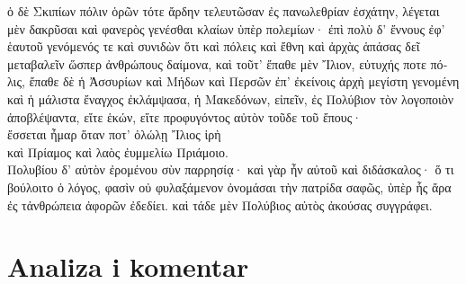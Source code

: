 {\large

\begin{greek}

\noindent  ὁ δὲ Σκιπίων πόλιν ὁρῶν τότε ἄρδην τελευτῶσαν ἐς πανωλεθρίαν ἐσχάτην, λέγεται μὲν δακρῦσαι καὶ φανερὸς γενέσθαι κλαίων ὑπὲρ πολεμίων· ἐπὶ πολὺ δ' ἔννους ἐφ' ἑαυτοῦ γενόμενός τε καὶ συνιδὼν ὅτι καὶ πόλεις καὶ ἔθνη καὶ ἀρχὰς ἁπάσας δεῖ μεταβαλεῖν ὥσπερ ἀνθρώπους δαίμονα, καὶ τοῦτ' ἔπαθε μὲν Ἴλιον, εὐτυχής ποτε πόλις, ἔπαθε δὲ ἡ Ἀσσυρίων καὶ Μήδων καὶ Περσῶν ἐπ' ἐκείνοις ἀρχὴ μεγίστη γενομένη καὶ ἡ μάλιστα ἔναγχος ἐκλάμψασα, ἡ Μακεδόνων, εἰπεῖν, ἐς Πολύβιον τὸν λογοποιὸν ἀποβλέψαντα, εἴτε ἑκών, εἴτε προφυγόντος αὐτὸν τοῦδε τοῦ ἔπους·\\
\tabto{2em} ἔσσεται ἦμαρ ὅταν ποτ' ὀλώλῃ Ἴλιος ἱρὴ\\
\tabto{2em} καὶ Πρίαμος καὶ λαὸς ἐυμμελίω Πριάμοιο.\\
Πολυβίου δ' αὐτὸν ἐρομένου σὺν παρρησίᾳ· καὶ γὰρ ἦν αὐτοῦ καὶ διδάσκαλος· ὅ τι βούλοιτο ὁ λόγος, φασὶν οὐ φυλαξάμενον ὀνομάσαι τὴν πατρίδα σαφῶς, ὑπὲρ ἧς ἄρα ἐς τἀνθρώπεια ἀφορῶν ἐδεδίει. καὶ τάδε μὲν Πολύβιος αὐτὸς ἀκούσας συγγράφει.

\end{greek}

}


\section*{Analiza i komentar}


